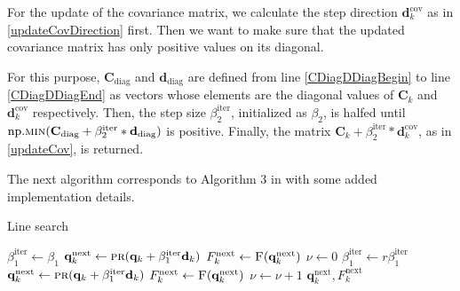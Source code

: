 For the update of the covariance matrix, we calculate the step direction $\mathbf{d}^\mathrm{cov}_k$ as in \ref{updateCovDirection} first. Then we want to make sure that the updated covariance matrix has only positive values on its diagonal.

For this purpose, $\mathbf{C}_\mathrm{diag}$ and $\mathbf{d}_\mathrm{diag}$ are defined from line \ref{CDiagDDiagBegin} to line \ref{CDiagDDiagEnd} as vectors whose elements are the diagonal values of $\mathbf{C}_k$ and $\mathbf{d}^\mathrm{cov}_k$ respectively. Then, the step size $\beta^\mathrm{iter}_2$, initialized as $\beta_2$, is halfed until $\mathrm{np.}\Call{min}{\mathbf{C}_\mathrm{diag}+\beta^\mathrm{iter}_2*\mathbf{d}_\mathrm{diag}}$ is positive. Finally, the matrix $\mathbf{C}_k+\beta^\mathrm{iter}_2*\mathbf{d}^\mathrm{cov}_k$, as in \eqref{updateCov}, is returned.

The next algorithm corresponds to Algorithm 3 in \cite{Keil2022-dj} with some added implementation details.

\begin{algorithm}[H]%
\caption{\label{LineSearchAlg}Line search}
\begin{algorithmic}[1]
\State $\beta^\mathrm{iter}_1 \gets \beta_1$
\State $\mathbf{q}^\mathrm{next}_k \gets \Call{pr}{\mathbf{q}_k+\beta^\mathrm{iter}_1\mathbf{d}_k}$
\State \label{LineSearchAlgFOMCall1}$F^\mathrm{next}_k \gets \Call{F}{\mathbf{q}^\mathrm{next}_k}$
\State $\nu \gets 0$
\State $\beta^\mathrm{iter}_1 \gets r\beta^\mathrm{iter}_1$
\State $\mathbf{q}^\mathrm{next}_k \gets \Call{pr}{\mathbf{q}_k+\beta^\mathrm{iter}_1\mathbf{d}_k}$
\State \label{LineSearchAlgFOMCall2}$F^\mathrm{next}_k \gets \Call{F}{\mathbf{q}^\mathrm{next}_k}$
\State $\nu \gets \nu+1$
\EndWhile
\Return $\mathbf{q}^\mathrm{next}_k, F^\mathrm{next}_k$
\EndFunction
\end{algorithmic}
\end{algorithm}

